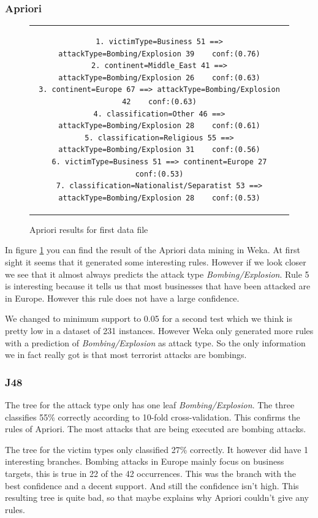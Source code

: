 \documentclass[a4]{article}
\begin{document}
\subsubsection{Apriori}
\FloatBarrier
\begin{figure}[!h]
\centering
\begin{tabular}{c}
\begin{lstlisting}
1. victimType=Business 51 ==> attackType=Bombing/Explosion 39    conf:(0.76)
2. continent=Middle_East 41 ==> attackType=Bombing/Explosion 26    conf:(0.63)
3. continent=Europe 67 ==> attackType=Bombing/Explosion 42    conf:(0.63)
4. classification=Other 46 ==> attackType=Bombing/Explosion 28    conf:(0.61)
5. classification=Religious 55 ==> attackType=Bombing/Explosion 31    conf:(0.56)
6. victimType=Business 51 ==> continent=Europe 27    conf:(0.53)
7. classification=Nationalist/Separatist 53 ==> attackType=Bombing/Explosion 28    conf:(0.53)
\end{lstlisting}
\end{tabular}
\caption{Apriori results for first data file}
\label{fig:apriori_1}
\end{figure}
In figure \ref{fig:apriori_1} you can find the result of the Apriori data mining in Weka. At first sight it seems that it generated some interesting rules. However if we look closer we see that it almost always predicts the attack type \textit{Bombing/Explosion}. Rule 5 is interesting because it tells us that most businesses that have been attacked are in Europe. However this rule does not have a large confidence.\par
We changed to minimum support to 0.05 for a second test which we think is pretty low in a dataset of 231 instances. However Weka only generated more rules with a prediction of \textit{Bombing/Explosion} as attack type. So the only information we in fact really got is that most terrorist attacks are bombings.
\subsubsection{J48}
The tree for the attack type only has one leaf \textit{Bombing/Explosion}. The three classifies 55\% correctly according to 10-fold cross-validation. This confirms the rules of Apriori. The most attacks that are being executed are bombing attacks.\par
The tree for the victim types only classified 27\% correctly. It however did have 1 interesting branches. Bombing attacks in Europe mainly focus on business targets, this is true in 22 of the 42 occurrences. This was the branch with the best confidence and a decent support. And still the confidence isn't high. This resulting tree is quite bad, so that maybe explains why Apriori couldn't give any rules.
\end{document}
